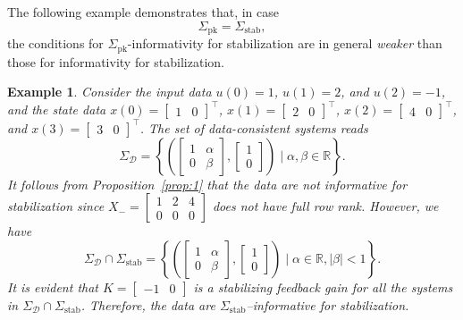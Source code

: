 \documentclass[9pt,shortpaper,twoside,web]{ieeecolor}
\newcommand{\set}[2]{\left\{#1 \mid #2\right\}}
\newtheorem{example}[theorem]{Example}
\begin{document}
The following example demonstrates that, in case
\begin{equation}
\label{eq:pk=stab}
\Sigma_\text{pk}=\Sigma_\text{stab},
\end{equation}
the conditions for $\Sigma_\text{pk}$-informativity for stabilization are in general \emph{weaker} than those for informativity for stabilization.

\begin{example}
\label{ex:1}
Consider the input data $u(0)=1$, \mbox{$u(1)=2$}, and $u(2)=-1$, and the state data $x(0)=\begin{bmatrix}
1 & 0
\end{bmatrix}^\top$, \mbox{$x(1)=\begin{bmatrix}
2 & 0
\end{bmatrix}^\top$}, $x(2)=\begin{bmatrix}
4 & 0
\end{bmatrix}^\top$, and $x(3)=\begin{bmatrix}
3 & 0
\end{bmatrix}^\top$. The set of data-consistent systems reads
\begin{equation}
\Sigma_\mathcal{D}=\set{\left(\begin{bmatrix}
1 & \alpha \\
0 & \beta
\end{bmatrix},\begin{bmatrix}
1 \\ 0
\end{bmatrix}\right)}{\alpha,\beta\in\mathbb{R}}.
\end{equation}
It follows from Proposition~\ref{prop:1} that the data are not informative for stabilization since $X_-=\begin{bmatrix}
1 & 2 & 4 \\
0 & 0 & 0
\end{bmatrix}$ does not have full row rank. However, we have
\begin{equation}
\Sigma_\mathcal{D}\cap\Sigma_\text{stab}=\set{\left(\begin{bmatrix}
1 & \alpha \\
0 & \beta
\end{bmatrix},\begin{bmatrix}
1 \\ 0
\end{bmatrix}\right)}{\alpha\in\mathbb{R},|\beta|<1}.
\end{equation}
It is evident that $K=\begin{bmatrix}
-1 & 0
\end{bmatrix}$ is a stabilizing feedback gain for all the systems in \mbox{$\Sigma_\mathcal{D}\cap\Sigma_\text{stab}$}. Therefore, the data are \mbox{$\Sigma_\text{stab}$--informative} for stabilization. 
\end{example}
\end{document}
